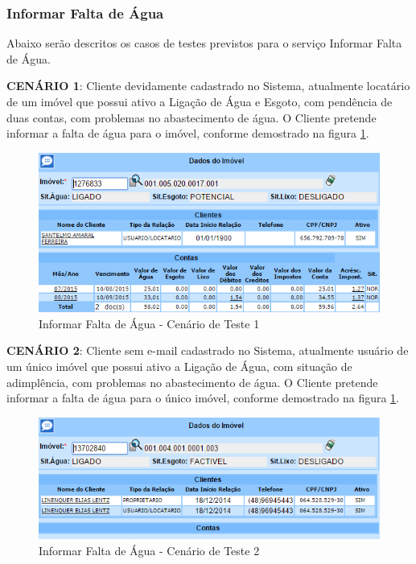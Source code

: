 \subsubsection{Informar Falta de Água}
Abaixo serão descritos os casos de testes previstos para o serviço Informar Falta de Água.
\begin{flushleft}
	\begin{description}
		\item \textbf{CENÁRIO 1}: Cliente devidamente cadastrado no Sistema, atualmente locatário de um imóvel que possui ativo a Ligação de Água e Esgoto, com pendência de duas contas, com problemas no abastecimento de água. O Cliente pretende informar a falta de água para o imóvel, conforme demostrado na figura \ref{figura:informarFaltaAguaCenario1}.
		\begin{figure}[H]
			\centering
			\caption{Informar Falta de Água - Cenário de Teste 1}
			\label{figura:informarFaltaAguaCenario1}
			\includegraphics{figuras/cenarios/informar_falta_agua/cenario_1.PNG}
		\end{figure}
	\end{description}
	
	\begin{description}
		\item \textbf{CENÁRIO 2}: Cliente sem e-mail cadastrado no Sistema, atualmente usuário de um único imóvel que possui ativo a Ligação de Água, com situação de adimplência, com problemas no abastecimento de água. O Cliente pretende informar a falta de água para o único imóvel, conforme demostrado na figura \ref{figura:informarFaltaAguaCenario1}.
		\begin{figure}[H]
			\centering
			\caption{Informar Falta de Água - Cenário de Teste 2}
			\label{figura:informarFaltaAguaCenario2}
			\includegraphics{figuras/cenarios/informar_falta_agua/cenario_2.PNG}
			\legend {\fontsize{10}{12}\selectfont {Fonte: Autoria Própria}.}	
		\end{figure}
		

\end{description}
\end{flushleft}
